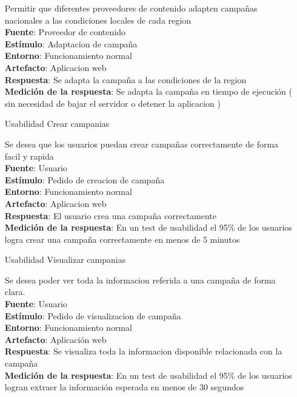 \documentclass[a4paper, 11pt]{article}
\begin{document}
\begin{itemize}
Permitir que diferentes proveedores de contenido adapten campañas nacionales a las condiciones locales de cada region \\
\textbf{Fuente}:  Proveedor de contenido  \\
\textbf{Estímulo}: Adaptacion de campaña \\
\textbf{Entorno}: Funcionamiento normal \\
\textbf{Artefacto}: Aplicacion web \\
\textbf{Respuesta}: Se adapta la campaña a las condiciones de la region \\
\textbf{Medición de la respuesta}: Se adapta la campaña en tiempo de ejecución ( sin necesidad de bajar el servidor o detener la aplicacion ) \\

\item[Usabilidad] Crear campanias

Se desea que los usuarios puedan crear campañas correctamente de forma facil y rapida \\
\textbf{Fuente}:  Usuario \\
\textbf{Estímulo}: Pedido de creacion de campaña \\
\textbf{Entorno}: Funcionamiento normal \\
\textbf{Artefacto}: Aplicacion web \\
\textbf{Respuesta}: El usuario crea una campaña correctamente \\
\textbf{Medición de la respuesta}: En un test de usabilidad el 95\% de los usuarios logra crear una campaña correctamente en menos de 5 minutos \\

\item[Usabilidad] Visualizar campanias

Se desea poder ver toda la informacion referida a una campaña de forma clara. \\
\textbf{Fuente}:  Usuario \\
\textbf{Estímulo}: Pedido de visualizacion de campaña \\
\textbf{Entorno}: Funcionamiento normal \\
\textbf{Artefacto}: Aplicación web \\
\textbf{Respuesta}: Se visualiza toda la informacion disponible relacionada con la campaña \\
\textbf{Medición de la respuesta}: En un test de usabilidad el 95\% de los usuarios logran extraer la información esperada en menos de 30 segundos \\


\end{itemize}
\end{document}
